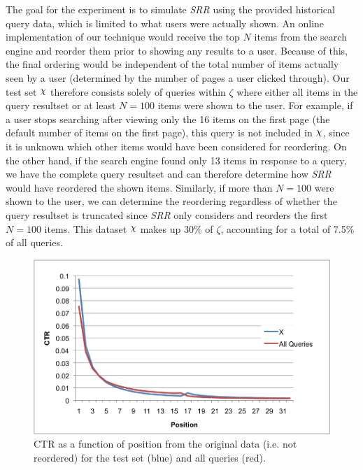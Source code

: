 \documentclass{article}
\def\Chi{\raisebox{2pt}{$\chi$}}
\begin{document}
The goal for the experiment is to simulate {\em SRR} using the provided
historical query data, which is limited to what users were actually shown. An
online implementation of our technique would receive the top $N$ items from the
search engine and reorder them prior to showing any results to a user. Because
of this, the final ordering would be independent of the total number of items
actually seen by a user (determined by the number of pages a user clicked
through).  Our test set $\Chi$ therefore consists solely of queries within
$\zeta$ where either all items in the query resultset or at least $N=100$ items
were shown to the user. For example, if a user stops searching after viewing
only the 16 items on the first page (the default number of items on the first
page), this query is not included in $\Chi$, since it is unknown which other
items would have been considered for reordering. On the other hand, if the
search engine found only 13 items in response to a query,  we have the complete
query resultset and can therefore determine how {\em SRR} would have reordered
the shown items. Similarly, if more than $N=100$ were shown to the user, we can
determine the reordering regardless of whether the query resultset is truncated
since {\em SRR} only considers and reorders the first $N=100$ items. This dataset $\Chi$
makes up 30\% of $\zeta$, accounting for a total of 7.5\% of all queries.

\begin{figure}[htbp!]
    \centering
    \includegraphics[width=\textwidth]{CTRcompare.png}
    \protect\caption{CTR as a function of position from the original data (i.e. not reordered) for the test set \protect\raisebox{2pt}{$\chi$} (blue) and all queries (red).}
    \label{fig:ctr_vs_position}
\end{figure}
\end{document}
